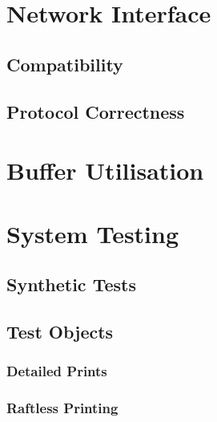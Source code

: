 	\section{Network Interface}
		
		\subsection{Compatibility}
		
		\subsection{Protocol Correctness}
	
	\section{Buffer Utilisation}
	
	\section{System Testing}
		
		\subsection{Synthetic Tests}
		
		\subsection{Test Objects}
			
			\subsubsection{Detailed Prints}
			
			\subsubsection{Raftless Printing}
